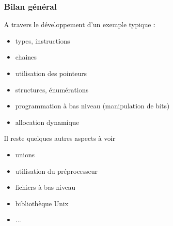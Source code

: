 \documentclass[]{beamer}
\begin{document}
\begin{frame}
  \frametitle{Bilan général}
A travers le développement d'un exemple typique :
\begin{multicols}{2}
\begin{itemize}
\item types, instructions
\item chaines
\item utilisation des pointeurs
\item structures, énumérations
\item programmation à bas niveau (manipulation de bits)
\item allocation dynamique
\end{itemize}

\break
Il reste quelques autres aspects à voir
\begin{itemize}
\item unions
\item utilisation du préprocesseur
\item fichiers à bas niveau
\item bibliothèque Unix
\item ...
\end{itemize}
\end{multicols}
\end{frame}
\end{document}

